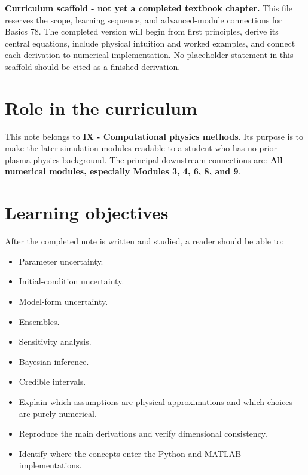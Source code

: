 \documentclass[11pt]{article}
\begin{document}

\begin{overviewbox}
\textbf{Curriculum scaffold - not yet a completed textbook chapter.} This file reserves the scope, learning sequence, and advanced-module connections for Basics 78. The completed version will begin from first principles, derive its central equations, include physical intuition and worked examples, and connect each derivation to numerical implementation. No placeholder statement in this scaffold should be cited as a finished derivation.
\end{overviewbox}

\ProjectTOC

\section{Role in the curriculum}
This note belongs to \textbf{IX - Computational physics methods}. Its purpose is to make the later simulation modules readable to a student who has no prior plasma-physics background. The principal downstream connections are: \textbf{All numerical modules, especially Modules 3, 4, 6, 8, and 9}.

\section{Learning objectives}
After the completed note is written and studied, a reader should be able to:
\begin{itemize}[leftmargin=1.6em]
\item Parameter uncertainty.
\item Initial-condition uncertainty.
\item Model-form uncertainty.
\item Ensembles.
\item Sensitivity analysis.
\item Bayesian inference.
\item Credible intervals.
\item Explain which assumptions are physical approximations and which choices are purely numerical.
\item Reproduce the main derivations and verify dimensional consistency.
\item Identify where the concepts enter the Python and MATLAB implementations.
\end{itemize}
\end{document}
